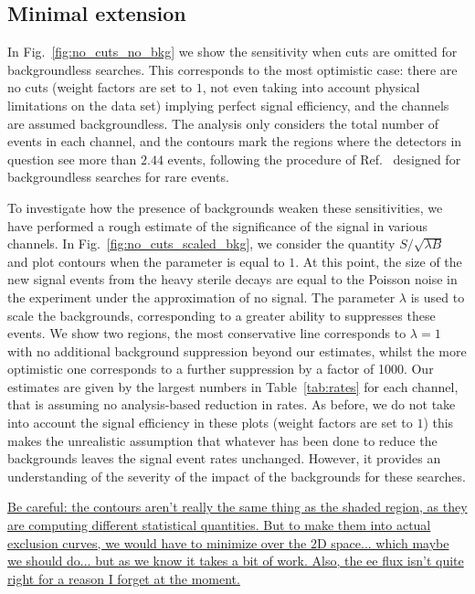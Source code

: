 \documentclass[11pt, a4paper]{article}
\newcommand{\reffig}[1]{Fig.~\ref{#1}}
\newcommand{\reftab}[1]{Table~\ref{#1}}
\newcommand{\refref}[1]{Ref.~\cite{#1}}
\newcommand{\newtext}[2]{\textcolor{#1}{\ul{#2}}}
\begin{document}
\subsection{Minimal extension}

In \reffig{fig:no_cuts_no_bkg} we show the sensitivity when cuts are omitted
for backgroundless searches. This corresponds to the most optimistic case:
there are no cuts (weight factors are set to $1$, not even taking into account
physical limitations on the data set) implying perfect signal efficiency, and
the channels are assumed backgroundless.
%
The analysis only considers the total number of events in each channel, and the
contours mark the regions where the detectors in question see more than $2.44$
events, following the procedure of \refref{Feldman:1997qc} designed for
backgroundless searches for rare events. 

To investigate how the presence of backgrounds weaken these sensitivities, we
have performed a rough estimate of the significance of the signal in various
channels. In \reffig{fig:no_cuts_scaled_bkg}, we consider the quantity
$S/\sqrt{\lambda B}$ and plot contours when the parameter is equal to $1$. At
this point, the size of the new signal events from the heavy sterile decays are
equal to the Poisson noise in the experiment under the approximation of no
signal. The parameter $\lambda$ is used to scale the backgrounds, corresponding
to a greater ability to suppresses these events.  We show two regions, the most
conservative line corresponds to $\lambda=1$ with no additional background
suppression beyond our estimates, whilst the more optimistic one corresponds to
a further suppression by a factor of 1000. Our estimates are given by the
largest numbers in \reftab{tab:rates} for each channel, that is assuming no
analysis-based reduction in rates. As before, we do not take into account the
signal efficiency in these plots (weight factors are set to $1$) this makes the
unrealistic assumption that whatever has been done to reduce the backgrounds
leaves the signal event rates unchanged. However, it provides an understanding of 
the severity of the impact of the backgrounds for these searches.

\newtext{PB}{Be careful: the contours aren't really the same thing as the
shaded region, as they are computing different statistical quantities. But to
make them into actual exclusion curves, we would have to minimize over the 2D
space... which maybe we should do... but as we know it takes a bit of work.
Also, the ee flux isn't quite right for a reason I forget at the moment.}
\end{document}
